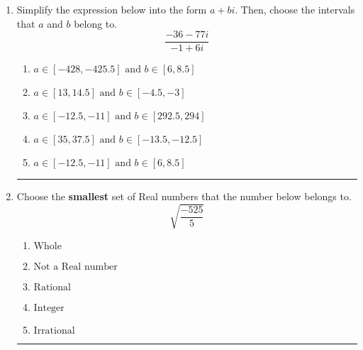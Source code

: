 \documentclass[14pt]{extbook}
\newcommand{\litem}[1]{\item#1\hspace*{-1cm}\rule{\textwidth}{0.4pt}}
\begin{document}
\begin{enumerate}
{\begin{enumerate}[label=\Alph*.]
\end{enumerate} }
\litem{
Simplify the expression below into the form $a+bi$. Then, choose the intervals that $a$ and $b$ belong to.\[ \frac{-36 - 77 i}{-1 + 6 i} \]\begin{enumerate}[label=\Alph*.]
\item \( a \in [-428, -425.5] \text{ and } b \in [6, 8.5] \)
\item \( a \in [13, 14.5] \text{ and } b \in [-4.5, -3] \)
\item \( a \in [-12.5, -11] \text{ and } b \in [292.5, 294] \)
\item \( a \in [35, 37.5] \text{ and } b \in [-13.5, -12.5] \)
\item \( a \in [-12.5, -11] \text{ and } b \in [6, 8.5] \)

\end{enumerate} }
\litem{
Choose the \textbf{smallest} set of Real numbers that the number below belongs to.\[ \sqrt{\frac{-525}{5}} \]\begin{enumerate}[label=\Alph*.]
\item \( \text{Whole} \)
\item \( \text{Not a Real number} \)
\item \( \text{Rational} \)
\item \( \text{Integer} \)
\item \( \text{Irrational} \)

\end{enumerate} }
\end{enumerate}
\end{document}
